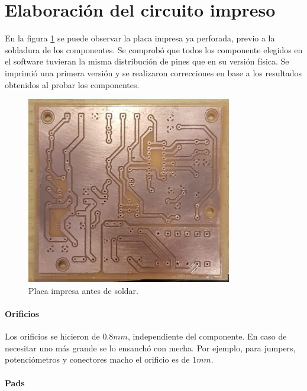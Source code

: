 \section{Elaboración del circuito impreso}

En la figura \ref{fig:pcb-implementada} se puede observar la placa impresa ya perforada,
previo a la soldadura de los componentes.
Se comprobó que todos los componente elegidos en el software tuvieran la misma distribución de pines que en su versión física. 
Se imprimió una primera versión y se realizaron correcciones en base a los resultados obtenidos al probar los componentes. \cite{pcb-atei}

\begin{figure}[H]
    \centering
    \includegraphics[width=0.8\textwidth]{images/pcb-implementada.jpeg}
    \caption{Placa impresa antes de soldar.}
    \label{fig:pcb-implementada}
\end{figure}

\paragraph{Orificios}

Los orificios se hicieron de $0.8mm$, independiente del componente. En caso de necesitar uno más grande se lo ensanchó con mecha.
Por ejemplo, para jumpers, potenciómetros y conectores macho el orificio es de $1mm$. 

\paragraph{Pads}

